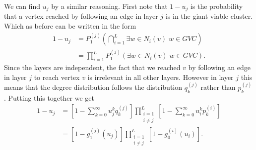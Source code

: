 \documentclass[
11pt, %
english, %
singlespacing, %
liststotoc, %
headsepline, %
]{MastersDoctoralThesis} %
\begin{document}
We can find $u_j$ by a similar reasoning. First note that $1 - u_j$ is the probability that a vertex reached by following an edge in layer $j$ is in the giant viable cluster. Which as before can be written in the form
\begin{align}
	1 - u_j &= P_1^{(j)}\left(\bigcap_{i = 1}^{L} \exists w \in N_i(v) \; w \in GVC\right)\\
	&= \prod_{i = 1}^{L}  P_1^{(j)}\left(\exists w \in N_i(v) \; w \in GVC \right).
\end{align}
Since the layers are independent, the fact that we reached $v$ by following an edge in layer $j$ to reach vertex $v$ is irrelevant in all other layers. However in layer $j$ this means that the degree distribution follows the distribution $q_k^{(j)}$ rather than $p_k^{(j)}$. Putting this together we get
\begin{align}
	1 - u_j &= \left[1 - \sum_{k = 0}^{\infty} u_j^k q_k^{(j)} \right] \prod_{\substack{i = 1 \\ i \neq j}}^{L}  \left[1 - \sum_{k = 0}^{\infty} u_i^k p^{(i)}_k \right] \\
	&= \left[1 - g_1^{(j)}(u_j) \right] \prod_{\substack{i = 1 \\ i \neq j}}^{L}  \left[1 - g_0^{(i)}(u_i) \right]. \label{Multiplex u final}
\end{align}
\end{document}
